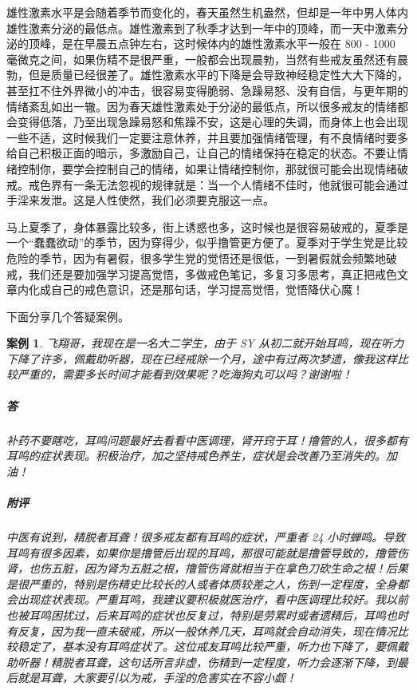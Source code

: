 \documentclass{ctexart}
\newtheorem{case}{案例}
\begin{document}
雄性激素水平是会随着季节而变化的，春天虽然生机盎然，但却是一年中男人体内雄性激素分泌的最低点。雄性激素到了秋季才达到一年中的顶峰，而一天中激素分泌的顶峰，是在早晨五点钟左右，这时候体内的雄性激素水平一般在 800 - 1000 毫微克之间，如果伤精不是很严重，一般都会出现晨勃，当然有些戒友虽然还有晨勃，但是质量已经很差了。雄性激素水平的下降是会导致神经稳定性大大下降的，甚至扛不住外界微小的冲击，很容易变得脆弱、急躁易怒、没有自信，与更年期的情绪紊乱如出一辙。因为春天雄性激素处于分泌的最低点，所以很多戒友的情绪都会变得低落，乃至出现急躁易怒和焦躁不安，这是心理的失调，而身体上也会出现一些不适，这时候我们一定要注意休养，并且要加强情绪管理，有不良情绪时要多给自己积极正面的暗示，多激励自己，让自己的情绪保持在稳定的状态。不要让情绪控制你，要学会控制自己的情绪，如果让情绪控制你，那就很可能会出现情绪破戒。戒色界有一条无法忽视的规律就是：当一个人情绪不佳时，他就很可能会通过手淫来发泄。这是人性使然，我们必须要克服这一点。

马上夏季了，身体暴露比较多，街上诱惑也多，这时候也是很容易破戒的，夏季是一个“蠢蠢欲动”的季节，因为穿得少，似乎撸管更方便了。夏季对于学生党是比较危险的季节，因为有暑假，很多学生党的觉悟还是很低，一到暑假就会频繁地破戒，我们还是要加强学习提高觉悟，多做戒色笔记，多复习多思考，真正把戒色文章内化成自己的戒色意识，还是那句话，学习提高觉悟，觉悟降伏心魔！

下面分享几个答疑案例。

\begin{case}
    飞翔哥，我现在是一名大二学生，由于 SY 从初二就开始耳鸣，现在听力下降了许多，佩戴助听器，现在已经戒除一个月，途中有过两次梦遗，像我这样比较严重的，需要多长时间才能看到效果呢？吃海狗丸可以吗？谢谢啦！
    \subparagraph{答} 补药不要瞎吃，耳鸣问题最好去看看中医调理，肾开窍于耳！撸管的人，很多都有耳鸣的症状表现。积极治疗，加之坚持戒色养生，症状是会改善乃至消失的。加油！
    \subparagraph{附评} 中医有说到，精脱者耳聋！很多戒友都有耳鸣的症状，严重者 24 小时蝉鸣。导致耳鸣有很多因素，如果你是撸管后出现的耳鸣，那很可能就是撸管导致的，撸管伤肾，也伤五脏，因为肾为五脏之根，撸管伤肾就相当于在拿色刀砍生命之根！后果是很严重的，特别是伤精史比较长的人或者体质较差之人，伤到一定程度，全身都会出现症状表现。严重耳鸣，我建议要积极就医治疗，看中医调理比较好。我以前也被耳鸣困扰过，后来耳鸣的症状也反复过，特别是劳累时或者遗精后，耳鸣也时有反复，因为我一直未破戒，所以一般休养几天，耳鸣就会自动消失，现在情况比较稳定了，基本没有耳鸣症状了。这位戒友耳鸣比较严重，听力也下降了，要佩戴助听器！精脱者耳聋，这句话所言非虚，伤精到一定程度，听力会逐渐下降，到最后就是耳聋，大家要引以为戒，手淫的危害实在不容小觑！
\end{case}
\end{document}
